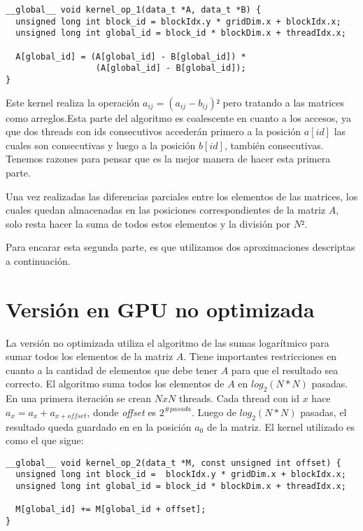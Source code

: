 \documentclass[a4paper,10pt]{article}
\begin{document}
\begin{lstlisting}[frame=single]
__global__ void kernel_op_1(data_t *A, data_t *B) {
  unsigned long int block_id = blockIdx.y * gridDim.x + blockIdx.x;
  unsigned long int global_id = block_id * blockDim.x + threadIdx.x;

  A[global_id] = (A[global_id] - B[global_id]) * 
                  (A[global_id] - B[global_id]);
}
\end{lstlisting}

Este kernel realiza la operación $a_{ij} = (a_{ij} - b_{ij})²$ pero tratando a las matrices como arreglos.Esta parte del algoritmo es coalescente en cuanto a los accesos, ya que dos threads con ids consecutivos accederán primero a la posición $a[id]$ las cuales son consecutivas y luego a la posición $b[id]$, también consecutivas. Tenemos razones para pensar que es la mejor manera de hacer esta primera parte.

Una vez realizadas las diferencias parciales entre los elementos de las matrices, los cuales quedan almacenadas en las posiciones correspondientes de la matriz $A$, solo resta hacer la suma de todos estos elementos y la división por $N²$.

Para encarar esta segunda parte, es que utilizamos dos aproximaciones descriptas a continuación. 

\section{Versión en GPU no optimizada}
La versión no optimizada utiliza el algoritmo de las sumas logarítmico para sumar todos los elementos de la matriz $A$. Tiene importantes restricciones en cuanto a la cantidad de elementos que debe tener $A$ para que el resultado sea correcto. El algoritmo suma todos los elementos de $A$ en $log_2(N*N)$ pasadas. En una primera iteración se crean $NxN$ threads. Cada thread con id $x$ hace $a_x = a_x + a_{x+offset}$, donde \textit{offset} es $2^{\#pasada}$. Luego de $log_2(N*N)$ pasadas, el resultado queda guardado en en la posición $a_0$ de la matriz.
El kernel utilizado es como el que sigue:

\begin{lstlisting}[frame=single]
__global__ void kernel_op_2(data_t *M, const unsigned int offset) {
  unsigned long int block_id =  blockIdx.y * gridDim.x + blockIdx.x;
  unsigned long int global_id = block_id * blockDim.x + threadIdx.x;

  M[global_id] += M[global_id + offset];
}
\end{lstlisting}
\end{document}
